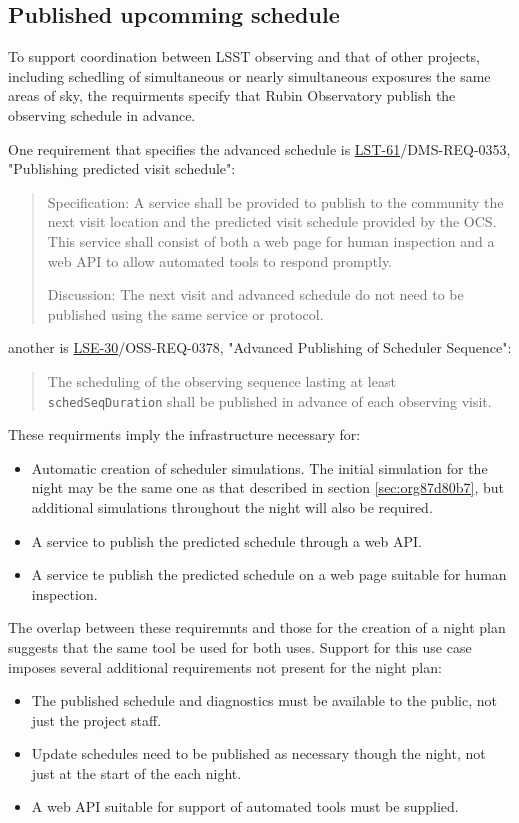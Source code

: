 \subsection{Published upcomming schedule}
\label{sec:orgcaaed7c}
To support coordination between LSST observing and that of other projects, including schedling of simultaneous or nearly simultaneous exposures the same areas of sky, the requirments specify that Rubin Observatory publish the observing schedule in advance.

One requirement that specifies the advanced schedule is \href{https://ls.st/lse-61}{LST-61}/DMS-REQ-0353, "Publishing predicted visit schedule":
\begin{quote}
Specification: A service shall be provided to publish to the community the next visit location and the predicted visit schedule provided by the OCS. This service shall consist of both a web page for human inspection and a web API to allow automated tools to respond promptly.

Discussion: The next visit and advanced schedule do not need to be published using the same service or protocol.
\end{quote}
another is \href{https://ls.st/lse-30}{LSE-30}/OSS-REQ-0378, "Advanced Publishing of Scheduler Sequence":
\begin{quote}
The scheduling of the observing sequence lasting at least \texttt{schedSeqDuration} shall be published in advance of each observing visit.
\end{quote}

These requirments imply the infrastructure necessary for:
\begin{itemize}
\item Automatic creation of scheduler simulations. The initial simulation for the night may be the same one as that described in section \ref{sec:org87d80b7}, but additional simulations throughout the night will also be required.
\item A service to publish the predicted schedule through a web API.
\item A service te publish the predicted schedule on a web page suitable for human inspection.
\end{itemize}

The overlap between these requiremnts and those for the creation of a night plan suggests that the same tool be used for both uses. 
Support for this use case imposes several additional requirements not present for the night plan:
\begin{itemize}
\item The published schedule and diagnostics must be available to the public, not just the project staff.
\item Update schedules need to be published as necessary though the night, not just at the start of the each night.
\item A web API suitable for support of automated tools must be supplied.
\end{itemize}

